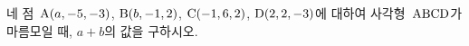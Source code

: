 네 점~$\mathrm{A}(a{,}\mkern3mu\mathopen{}-5{,}\mkern3mu\mathopen{}-3)$, $\mathrm{B}(b{,}\mkern3mu\mathopen{}-1{,}\mkern3mu\mathopen{}2)$, $\mathrm{C}(-1{,}\mkern3mu\mathopen{}6{,}\mkern3mu\mathopen{}2)$, $\mathrm{D}(2{,}\mkern3mu\mathopen{}2{,}\mkern3mu\mathopen{}-3)$에 대하여 사각형~$\mathrm{ABCD}$가 마름모일 때, $a+b$의 값을 구하시오. 
